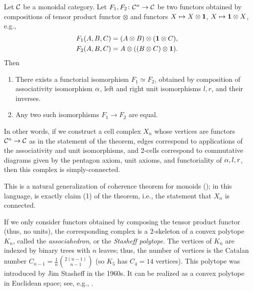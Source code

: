 \begin{theorem}\label{t:maclane}\par

  \noindent
  Let $\mathcal{C}$ be a monoidal category. Let $F_1, F_2\colon \mathcal{C}^n\to \mathcal{C}$
  be two functors obtained by compositions of tensor product functor $\otimes$
  and functors $X\mapsto X\otimes \mathbf{1}$, $X\mapsto \mathbf{1} \otimes X$, e.g.,
  \begin{align*}
    F_1(A,B,C)&=(A\otimes B)\otimes (\mathbf{1}\otimes C),\\
    F_2(A,B,C)&=A\otimes (( B\otimes  C)\otimes \mathbf{1}).
  \end{align*}
  Then
  \begin{enumerate}
    \item There exists a functorial isomorphism $F_1\simeq F_2$, obtained
      by composition of associativity isomorphism $\alpha$, left and right
      unit isomorphisms $l,r$, and their inverses.
    \item Any two such isomorphisms $F_1\to F_2$ are equal.
  \end{enumerate}
\end{theorem}
In other words, if we construct a cell complex $X_n$ whose vertices are functors
$\mathcal{C}^n\to \mathcal{C}$ as in the statement of the theorem, edges correspond to
applications of the associativity and unit isomorphisms, and 2-cells correspond
to commutative diagrams given by the pentagon axiom, unit axioms, and
functoriality of $\alpha, l, r$, then this complex is simply-connected.

This is a natural generalization of coherence theorem for monoids
(); in this language, 
is exactly claim (1) of the theorem, i.e., the statement that $X_n$
is connected.

\begin{remark}\label{r:stasheff}
  If we only consider functors obtained by composing the tensor product functor
  (thus, no units), the corresponding complex is a 2-skeleton of a convex
  polytope $K_n$, called the \emph{associahedron}, or the
  \emph{Stasheff
  polytope}. The vertices of $K_n$ are indexed by
  binary trees with $n$ leaves; thus, the number of vertices is the Catalan
  number $C_{n-1} = \frac{1}{n}\binom{2(n-1)}{n-1}$ (so $K_5$ has
  $C_4 = 14$ vertices).
  This polytope was introduced by Jim Stasheff in the 1960s. It can be realized
  as a convex polytope in Euclidean space; see, e.g.,
  .
\end{remark}

